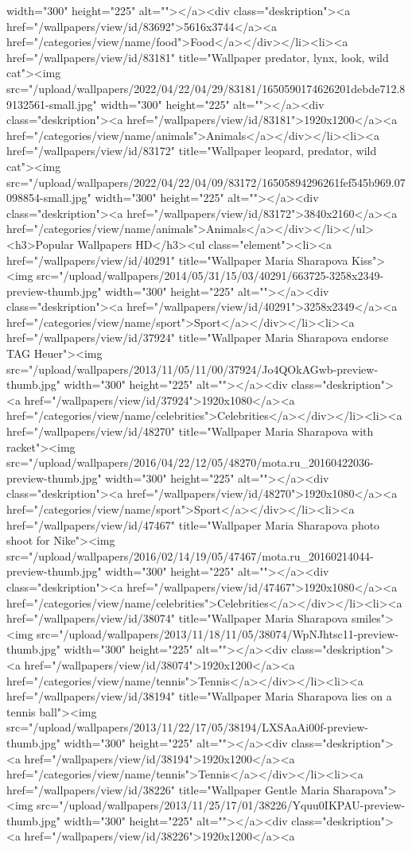width="300" height="225" alt=""></a><div class="deskription"><a href="/wallpapers/view/id/83692">5616x3744</a><a href="/categories/view/name/food">Food</a></div></li><li><a href="/wallpapers/view/id/83181" title="Wallpaper predator, lynx, look, wild cat"><img src="/upload/wallpapers/2022/04/22/04/29/83181/1650590174626201debde712.89132561-small.jpg" width="300" height="225" alt=""></a><div class="deskription"><a href="/wallpapers/view/id/83181">1920x1200</a><a href="/categories/view/name/animals">Animals</a></div></li><li><a href="/wallpapers/view/id/83172" title="Wallpaper leopard, predator, wild cat"><img src="/upload/wallpapers/2022/04/22/04/09/83172/16505894296261fef545b969.07098854-small.jpg" width="300" height="225" alt=""></a><div class="deskription"><a href="/wallpapers/view/id/83172">3840x2160</a><a href="/categories/view/name/animals">Animals</a></div></li></ul><h3>Popular Wallpapers HD</h3><ul class="element"><li><a href="/wallpapers/view/id/40291" title="Wallpaper Maria Sharapova Kiss"><img src="/upload/wallpapers/2014/05/31/15/03/40291/663725-3258x2349-preview-thumb.jpg" width="300" height="225" alt=""></a><div class="deskription"><a href="/wallpapers/view/id/40291">3258x2349</a><a href="/categories/view/name/sport">Sport</a></div></li><li><a href="/wallpapers/view/id/37924" title="Wallpaper Maria Sharapova endorse TAG Heuer"><img src="/upload/wallpapers/2013/11/05/11/00/37924/Jo4QOkAGwb-preview-thumb.jpg" width="300" height="225" alt=""></a><div class="deskription"><a href="/wallpapers/view/id/37924">1920x1080</a><a href="/categories/view/name/celebrities">Celebrities</a></div></li><li><a href="/wallpapers/view/id/48270" title="Wallpaper Maria Sharapova with racket"><img src="/upload/wallpapers/2016/04/22/12/05/48270/mota.ru_20160422036-preview-thumb.jpg" width="300" height="225" alt=""></a><div class="deskription"><a href="/wallpapers/view/id/48270">1920x1080</a><a href="/categories/view/name/sport">Sport</a></div></li><li><a href="/wallpapers/view/id/47467" title="Wallpaper Maria Sharapova photo shoot for Nike"><img src="/upload/wallpapers/2016/02/14/19/05/47467/mota.ru_20160214044-preview-thumb.jpg" width="300" height="225" alt=""></a><div class="deskription"><a href="/wallpapers/view/id/47467">1920x1080</a><a href="/categories/view/name/celebrities">Celebrities</a></div></li><li><a href="/wallpapers/view/id/38074" title="Wallpaper Maria Sharapova smiles"><img src="/upload/wallpapers/2013/11/18/11/05/38074/WpNJhtsc11-preview-thumb.jpg" width="300" height="225" alt=""></a><div class="deskription"><a href="/wallpapers/view/id/38074">1920x1200</a><a href="/categories/view/name/tennis">Tennis</a></div></li><li><a href="/wallpapers/view/id/38194" title="Wallpaper Maria Sharapova lies on a tennis ball"><img src="/upload/wallpapers/2013/11/22/17/05/38194/LXSAaAi00f-preview-thumb.jpg" width="300" height="225" alt=""></a><div class="deskription"><a href="/wallpapers/view/id/38194">1920x1200</a><a href="/categories/view/name/tennis">Tennis</a></div></li><li><a href="/wallpapers/view/id/38226" title="Wallpaper Gentle Maria Sharapova"><img src="/upload/wallpapers/2013/11/25/17/01/38226/Yquu0IKPAU-preview-thumb.jpg" width="300" height="225" alt=""></a><div class="deskription"><a href="/wallpapers/view/id/38226">1920x1200</a><a 